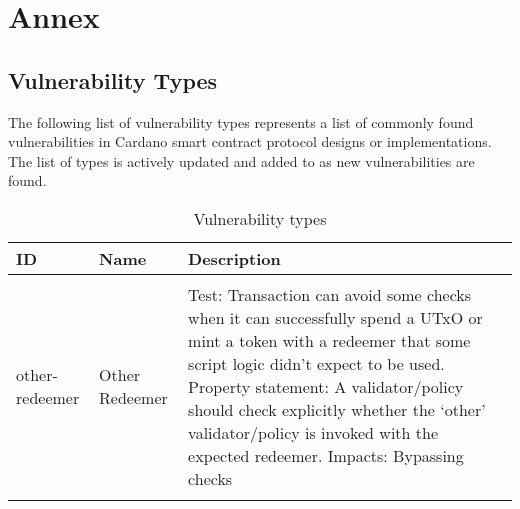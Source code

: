 \chapter{Annex}

\section{Vulnerability Types}

The following list of vulnerability types represents a list of commonly found vulnerabilities in Cardano smart contract protocol designs or implementations. The list of types is actively updated and added to as new vulnerabilities are found.

\begin{longtable}{p{3cm} p{3cm} p{6.5cm}}
    \textbf{ID} & \textbf{Name} & \textbf{Description} \\
    \hline \\

    other-redeemer
    & Other Redeemer
    & Test: Transaction can avoid some checks when it can successfully spend a UTxO or mint a token with a redeemer that some script logic didn’t expect to be used.
    Property statement: A validator/policy should check explicitly whether the ‘other’ validator/policy is invoked with the expected redeemer. 
    Impacts: Bypassing checks\\

    \caption{Vulnerability types}
    \label{tab:vulnerability_types}
\end{longtable}
